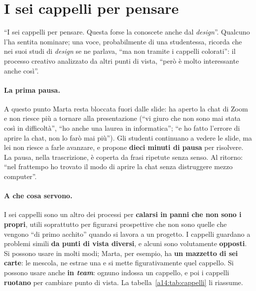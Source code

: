 \section{I sei cappelli per pensare}
\label{a14:sec:cappelli}



``I sei cappelli per pensare. Questa forse la conoscete anche dal \emph{design}''. Qualcuno
l'ha sentita nominare; una voce, probabilmente di una studentessa, ricorda che nei suoi studi di \emph{design} se ne
parlava, ``ma non tramite i cappelli colorati'': il processo creativo analizzato da altri
punti di vista, ``però è molto interessante anche così''.

\paragraph{La prima pausa.} A questo punto Marta resta bloccata fuori dalle slide: ha aperto
la chat di Zoom e non riesce più a tornare alla presentazione (``vi giuro che non sono mai
stata così in difficoltà'', ``ho anche una laurea in informatica''; ``e ho fatto l'errore di
aprire la chat, non lo farò mai più''). Gli studenti continuano a vedere le slide, ma lei non
riesce a farle avanzare, e propone \textbf{dieci minuti di pausa} per risolvere. La pausa,
nella trascrizione, è coperta da frasi ripetute senza senso. Al ritorno: ``nel frattempo ho
trovato il modo di aprire la chat senza distruggere mezzo computer''.

\paragraph{A che cosa servono.} I sei cappelli sono un altro dei processi per
\textbf{calarsi in panni che non sono i propri}, utili soprattutto per figurarsi prospettive
che non sono quelle che vengono ``di primo acchito'' quando si lavora a un progetto. I
cappelli guardano a problemi simili \textbf{da punti di vista diversi}, e alcuni sono
volutamente \textbf{opposti}. Si possono usare in molti modi; Marta, per esempio, ha
\textbf{un mazzetto di sei carte}: le mescola, ne estrae una e si mette figurativamente quel
cappello. Si possono usare anche \textbf{in \emph{team}}: ognuno indossa un cappello, e poi
i cappelli \textbf{ruotano} per cambiare punto di vista. La tabella~\ref{a14:tab:cappelli}
li riassume.

